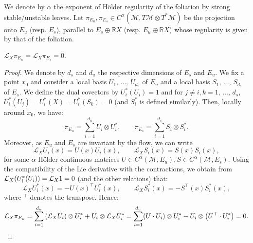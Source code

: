 \documentclass[AHL,Unicode,longabstracts,published]{cedram}
\newcommand{\R}{\mathbb{R}}
\newcommand{\mc}{\mathcal}
\newcommand{\M}{\mathcal{M}}
\begin{document}
We denote by $\alpha$ the exponent of H\"older regularity of the foliation by strong stable/unstable leaves. Let $\pi_{E_u}, \pi_{E_s} \in C^\alpha(\M, T\M \otimes T^*\M)$ be the projection onto $E_u$ (resp. $E_s$), parallel to $E_s \oplus \R X$ (resp. $E_u \oplus \R X$) whose regularity is given by that of the foliation.

\begin{lemm}\label{lemma:projecteurs}
$\mc{L}_X \pi_{E_u} = \mc{L}_X \pi_{E_s} = 0.$
\end{lemm}

\begin{proof}
We denote by $d_s$ and $d_u$ the respective dimensions of $E_s$ and $E_u$. We fix a point $x_0$ and consider a local basis $U_1,\,\dots,\,U_{d_u}$ of $E_u$ and a local basis $S_1,\,\dots,\,S_{d_s}$ of $E_s$. We define the dual covectors by $U_i^*(U_i) = 1$ and for $j \neq i, k = 1,\,\dots,\,d_s$, $U_i^*(U_j)= U_i^*(X) = U_i^*(S_k) = 0$ (and $S_i^*$ is defined similarly). Then, locally around $x_0$, we have:
\[
\pi_{E_u} = \sum_{i=1}^{d_u} U_i \otimes U_i^*, \qquad \pi_{E_s} = \sum_{i=1}^{d_s} S_i \otimes S_i^*.
\]
Moreover, as $E_u$ and $E_s$ are invariant by the flow, we can write
\[
\mc{L}_X U_i(x) = U(x) U_i(x), \qquad \mc{L}_X S_i(x) = S(x) S_i(x),
\]
for some $\alpha$-H\"older continuous matrices $U \in C^\alpha(\M, E_u), S \in C^\alpha(\M,E_s)$. Using the compatibility of the Lie derivative with the contractions, we obtain from $\mc{L}_X (U_i^*(U_i))\linebreak = \mc{L}_X 1=0$ (and the other relations) that:
\[
\mc{L}_X U_i^*(x) = -U(x)^\top U_i^*(x), \qquad \mc{L}_X S^*_i(x) = -S^\top(x) S_i^*(x),
\]
where ${}^{\top}$ denotes the transpose. Hence:
\[
\mc{L}_X \pi_{E_u} = \sum_{i=1}^{d_u} \left(\mc{L}_XU_i\right) \otimes U_i^* + U_i \otimes \mc{L}_X U_i^* = \sum_{i=1}^{d_u} (U \cdot U_i) \otimes U_i^* - U_i \otimes \left(U^\top \cdot U_i^*\right) = 0.\qedhere
\]
\end{proof}
\end{document}

